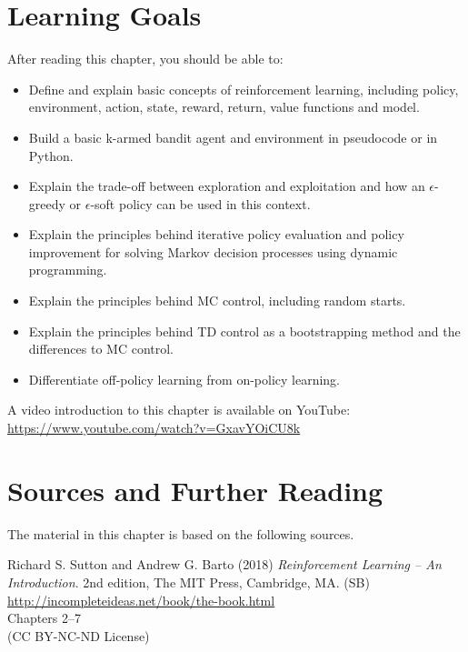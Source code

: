%
%
\section*{Learning Goals}

After reading this chapter, you should be able to:
\begin{itemize}
    \item Define and explain basic concepts of reinforcement learning, including policy, environment, action, state, reward, return, value functions and model.
    \item Build a basic k-armed bandit agent and environment in pseudocode or in Python.
    \item  Explain the trade-off between exploration and exploitation and how an $\epsilon$-greedy or $\epsilon$-soft policy can be used in this context.
    \item Explain the principles behind iterative policy evaluation and policy improvement for solving Markov decision processes using dynamic programming.
    \item Explain the principles behind MC control, including random starts. 
    \item Explain the principles behind TD control as a bootstrapping method and the differences to MC control.   
    \item Differentiate off-policy learning from on-policy learning. 
\end{itemize}

\begin{advanced}
\begin{videobox}
A video introduction to this chapter is available on YouTube:\\

\url{https://www.youtube.com/watch?v=GxavYOiCU8k}
\end{videobox}
\end{advanced}

\section*{Sources and Further Reading}

The material in this chapter is based on the following sources. 

\begin{resourcebox}
Richard S. Sutton and Andrew G. Barto (2018) \emph{Reinforcement Learning -- An Introduction}. 2nd edition, The MIT Press, Cambridge, MA. (SB) \\
\vspace{0.5\baselineskip}
\small\url{http://incompleteideas.net/book/the-book.html}\normalsize \\
\vspace{0.5\baselineskip}
Chapters 2--7 \\
\vspace{0.5\baselineskip}
(CC BY-NC-ND License)
\end{resourcebox}

